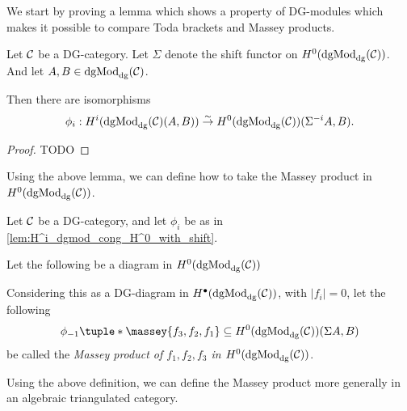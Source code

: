 We start by proving a lemma which shows a property of DG-modules which makes it possible to compare Toda brackets and Massey products.

\begin{lemma}
    \label{lem:H^i_dgmod_cong_H^0_with_shift}
    Let \( {\mathcal{C}} \) be a DG-category. Let \( \Sigma \) denote the shift functor on \( H^0(\operatorname{dgMod}_{\operatorname{dg}}({\mathcal{C}})) \). And let \( A, B \in \operatorname{dgMod}_{\operatorname{dg}}({\mathcal{C}}) \).

    Then there are isomorphisms
    \[
        \phi_i: H^i(\operatorname{dgMod}_{\operatorname{dg}}({\mathcal{C}})(A, B)) \stackrel{\sim}{\to} H^0(\operatorname{dgMod}_{\operatorname{dg}}({\mathcal{C}}))(\Sigma^{-i} A, B).
    \]
\end{lemma}
\begin{proof}
    TODO
\end{proof}

Using the above lemma, we can define how to take the Massey product in \( H^0(\operatorname{dgMod}_{\operatorname{dg}}({\mathcal{C}})) \).

\begin{definition}
    \label{def:massey_product_H^0(dgMod_dg(C))}
    Let \( {\mathcal{C}} \) be a DG-category, and let \( \phi_i \) be as in \autoref{lem:H^i_dgmod_cong_H^0_with_shift}.
    
    Let the following be a diagram in \( H^0(\operatorname{dgMod}_{\operatorname{dg}}({\mathcal{C}})) \)
    \begin{center}
    \end{center}
    Considering this as a DG-diagram in \( H^{\bullet}(\operatorname{dgMod}_{\operatorname{dg}}({\mathcal{C}})) \), with \( |f_i| = 0 \), let the following
    \[
        \phi_{-1}\tuple*{\massey{f_3, f_2, f_1}} \subseteq H^0(\dgMod_{\dg}(\Cc))(\Sigma A, B)
    \]
    be called the \emph{Massey product of \( f_1, f_2, f_3 \) in \( H^0(\operatorname{dgMod}_{\operatorname{dg}}({\mathcal{C}})) \)}.
\end{definition}

Using the above definition, we can define the Massey product more generally in an algebraic triangulated category.

